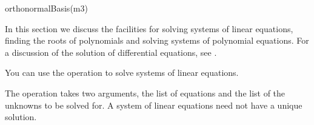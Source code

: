 {{{{{{{{{{{\begin{xtc}
\begin{TeXOutput}
\end{TeXOutput}
\end{xtc}
\begin{xtc}
\begin{xtccomment}
\end{xtccomment}
\begin{spadsrc}
orthonormalBasis(m3) 
\end{spadsrc}
\begin{TeXOutput}
\begin{fricasmath}{11}
%
\end{fricasmath}
\end{TeXOutput}
\end{xtc}

%
In this section we discuss the \Language{} facilities for solving
systems of linear equations, finding the roots of polynomials and
solving systems of polynomial equations.
For a discussion of the solution of differential equations, see
.


You can use the operation  to solve systems of linear equations.

The operation  takes two arguments, the list of equations and the
list of the unknowns to be solved for.
A system of linear equations need not have a unique solution.

}}}}}}}}}}}
